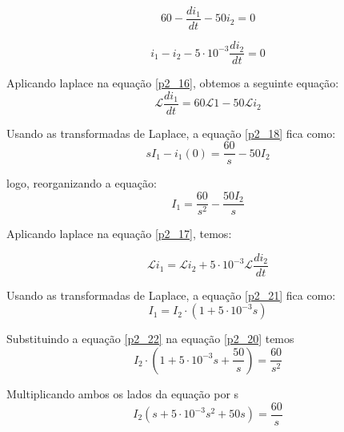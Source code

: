 \documentclass[12pt]{article}%
\begin{document}
    \begin{equation}
        60 - \frac{di_1}{dt} - 50i_2 = 0
    \label{p2_16}
    \end{equation}
    
    \begin{equation}
       i_1-i_2 - 5 \cdot 10^{-3}\frac{di_2}{dt} = 0
    \label{p2_17}
    \end{equation}
    
    Aplicando laplace na equação \ref{p2_16}, obtemos a seguinte equação:
    \begin{equation}
       \mathcal{L}{\frac{di_1}{dt}} = 60 \mathcal{L}{1}-50 \mathcal{L}{i_2}
    \label{p2_18}
    \end{equation}
    
    Usando as transformadas de Laplace, a equação \ref{p2_18} fica como: 
    \begin{equation}
      sI_1-i_1(0)=\frac{60}{s}-50I_2
    \label{p2_19}
    \end{equation}
    
    logo, reorganizando a equação:
    \begin{equation}
       I_1 = \frac{60}{s^2}-\frac{50I_2}{s} 
    \label{p2_20}
    \end{equation}
    
    Aplicando laplace na equação \ref{p2_17}, temos:
    
    \begin{equation}
      \mathcal{L}{i_1} = \mathcal{L}{i_2} + 5\cdot10^{-3} \mathcal{L}{\frac{di_2}{dt}}
    \label{p2_21}
    \end{equation}
    
    Usando as transformadas de Laplace, a equação \ref{p2_21} fica como:
    \begin{equation}
      I_1 = I_2 \cdot (1+5\cdot 10^{-3}s)
    \label{p2_22}
    \end{equation}
    
    Substituindo a equação \ref{p2_22} na equação \ref{p2_20} temos
    \begin{equation}
      I_2 \cdot (1 + 5 \cdot 10^{-3}s + \frac{50}{s}) = \frac{60}{s^2}
    \label{p2_23}
    \end{equation}
    
    Multiplicando ambos os lados da equação por s
    \begin{equation}
        I_2  (s + 5 \cdot 10^{-3}s^2 + 50s) = \frac{60}{s}
    \label{p2_24}
    \end{equation}
    
\end{document}
